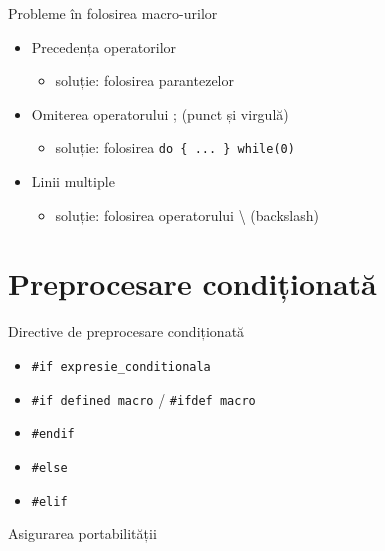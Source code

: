 \documentclass{beamer}
\begin{document}
\begin{frame}{Probleme în folosirea macro-urilor}
	\begin{itemize}
		\item Precedența operatorilor
			\begin{itemize}
				\item soluție: folosirea parantezelor
			\end{itemize}
		\item Omiterea operatorului ; (punct și virgulă)
			\begin{itemize}
				\item soluție: folosirea \texttt{do \{ ... \} while(0)}
			\end{itemize}
		\item Linii multiple
			\begin{itemize}
				\item soluție: folosirea operatorului \textbackslash{}
(backslash)
			\end{itemize}
	\end{itemize}
\end{frame}

\section{Preprocesare condiționată}

\frame{\tableofcontents[currentsection]}

\begin{frame}{Directive de preprocesare condiționată}
	\begin{itemize}
		\item \texttt{\#if expresie\_conditionala}
		\item \texttt{\#if defined macro} / \texttt{\#ifdef macro}
		\item \texttt{\#endif}
		\item \texttt{\#else}
		\item \texttt{\#elif}
	\end{itemize}
\end{frame}

\begin{frame}{Asigurarea portabilității}
	
\end{frame}
\end{document}
